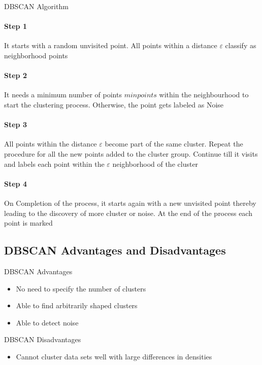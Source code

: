\begin{KR}{DBSCAN Algorithm}\\
\paragraph{Step 1}
It starts with a random unvisited point. All points within a distance $\varepsilon$ classify as neighborhood points

\paragraph{Step 2}
It needs a minimum number of points $minpoints$ within the neighbourhood to start the clustering process. Otherwise, the point gets labeled as Noise

\paragraph{Step 3}
All points within the distance $\varepsilon$ become part of the same cluster. Repeat the procedure for all the new points added to the cluster group. Continue till it visits and labels each point within the $\varepsilon$ neighborhood of the cluster

\paragraph{Step 4}
On Completion of the process, it starts again with a new unvisited point thereby leading to the discovery of more cluster or noise. At the end of the process each point is marked
\end{KR}

\subsection{DBSCAN Advantages and Disadvantages}

\begin{concept}{DBSCAN Advantages}
\begin{itemize}
    \item No need to specify the number of clusters
    \item Able to find arbitrarily shaped clusters
    \item Able to detect noise
\end{itemize}
\end{concept}

\begin{concept}{DBSCAN Disadvantages}
\begin{itemize}
    \item Cannot cluster data sets well with large differences in densities
\end{itemize}
\end{concept}

